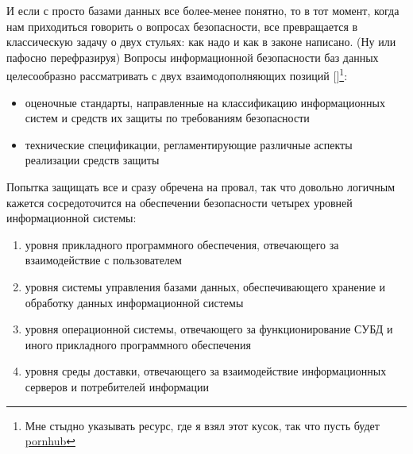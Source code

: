 
И если с просто базами данных все более-менее понятно, то в тот момент, когда нам приходиться говорить о вопросах безопасности, все превращается в классическую задачу о двух стульях: как надо и как в законе написано. (Ну или пафосно перефразируя) Вопросы информационной безопасности баз данных целесообразно рассматривать с двух взаимодополняющих позиций \textcite{Al2015}[\textcite{Lihonosov2011}]\footnote{Мне стыдно указывать ресурс, где я взял этот кусок, так что пусть будет \href{http://www.e-biblio.ru/book/bib/01_informatika/b_baz_dan/sg.html\#_Toc327430692}{pornhub}}:
\begin{itemize}
	\item оценочные стандарты, направленные на классификацию информационных систем и средств их защиты по требованиям безопасности
	\item технические спецификации, регламентирующие различные аспекты реализации средств защиты
\end{itemize} 

Попытка защищать все и сразу обречена на провал, так что довольно логичным кажется сосредоточится на обеспечении безопасности четырех уровней информационной системы:
\begin{enumerate}
	\item уровня прикладного программного обеспечения, отвечающего за взаимодействие с пользователем
	\item уровня системы управления базами данных, обеспечивающего хранение и обработку данных информационной системы
	\item уровня операционной системы, отвечающего за функционирование СУБД и иного прикладного программного обеспечения
	\item уровня среды доставки, отвечающего за взаимодействие информационных серверов и потребителей информации
\end{enumerate}

